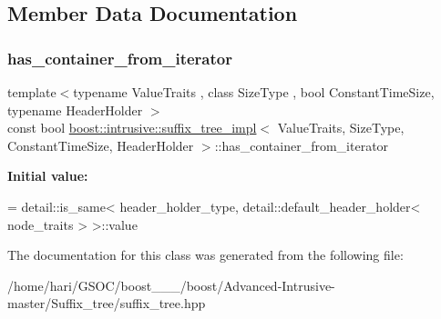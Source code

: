 \subsection{Member Data Documentation}
\mbox{\label{classboost_1_1intrusive_1_1suffix__tree__impl_a2661f32bb11991cfc1e5e5b7f40d658e}} 
\subsubsection{\texorpdfstring{has\+\_\+container\+\_\+from\+\_\+iterator}{has\_container\_from\_iterator}}
{\footnotesize\ttfamily template$<$typename Value\+Traits , class Size\+Type , bool Constant\+Time\+Size, typename Header\+Holder $>$ \\
const bool \hyperlink{classboost_1_1intrusive_1_1suffix__tree__impl}{boost\+::intrusive\+::suffix\+\_\+tree\+\_\+impl}$<$ Value\+Traits, Size\+Type, Constant\+Time\+Size, Header\+Holder $>$\+::has\+\_\+container\+\_\+from\+\_\+iterator\hspace{0.3cm}{\ttfamily [static]}}

{\bfseries Initial value\+:}
\begin{DoxyCode}
=
        detail::is\_same< header\_holder\_type, detail::default\_header\_holder< node\_traits > >::value
\end{DoxyCode}


The documentation for this class was generated from the following file\+:\begin{DoxyCompactItemize}
\item 
/home/hari/\+G\+S\+O\+C/boost\+\_\+\_\+\_/boost/\+Advanced-\/\+Intrusive-\/master/\+Suffix\+\_\+tree/suffix\+\_\+tree.\+hpp\end{DoxyCompactItemize}
